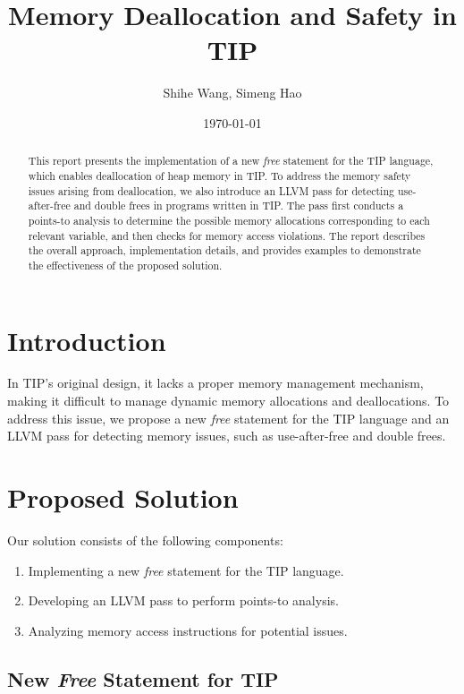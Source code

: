 \documentclass[12pt,a4paper]{article}
\title{Memory Deallocation and Safety in TIP}
\author{Shihe Wang, Simeng Hao}
\date{\today}
\begin{document}
\maketitle

\begin{abstract}
This report presents the implementation of a new \textit{free} statement for the TIP language, which enables deallocation of heap memory in TIP. To address the memory safety issues arising from deallocation, we also introduce an LLVM pass for detecting use-after-free and double frees in programs written in TIP. The pass first conducts a points-to analysis to determine the possible memory allocations corresponding to each relevant variable, and then checks for memory access violations. The report describes the overall approach, implementation details, and provides examples to demonstrate the effectiveness of the proposed solution.
\end{abstract}

\section{Introduction}

In TIP's original design, it lacks a proper memory management mechanism, making it difficult to manage dynamic memory allocations and deallocations. To address this issue, we propose a new \textit{free} statement for the TIP language and an LLVM pass for detecting memory issues, such as use-after-free and double frees.

\section{Proposed Solution}

Our solution consists of the following components:

\begin{enumerate}
  \item Implementing a new \textit{free} statement for the TIP language.
  \item Developing an LLVM pass to perform points-to analysis.
  \item Analyzing memory access instructions for potential issues.
\end{enumerate}

\subsection{New \textit{Free} Statement for TIP}
\end{document}
